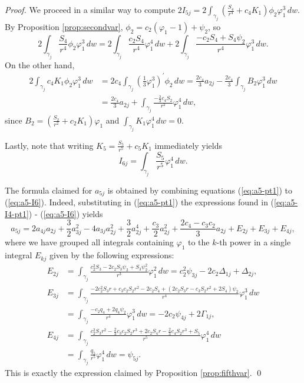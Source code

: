 \begin{proof}
We proceed in a similar way to compute $2I_{5j}=2\int_{\gamma_j}\left(\frac{S_4}{r^4}+c_4K_1\right)\phi_2\varphi_1^3\,dw$. By Proposition \ref{prop:secondvar}, $\phi_2=c_2(\varphi_1-1)+\psi_2$, so
\begin{equation}\label{eq:a5-I5-pt1}
2\int_{\gamma_j}\frac{S_4}{r^4}\phi_2\varphi_1^3\,dw=2\int_{\gamma_j}\frac{c_2S_4}{r^4}\varphi_1^4\,dw+2\int_{\gamma_j}\frac{-c_2S_4+S_4\psi_2}{r^4}\varphi_1^3\,dw. 
\end{equation}
On the other hand, 
\begin{align}\label{eq:a5-I5-pt2}
2\int_{\gamma_j}c_4K_1\phi_2\varphi_1^3\,dw	&= 2c_4\int_{\gamma_j}\left(\frac{1}{3}\varphi_1^3\right)^{\prime}\phi_2\,dw=\frac{2c_4}{3}a_{2j}-\frac{2c_4}{3}\int_{\gamma_j}B_2\varphi_1^3\,dw \nonumber \\
						&= \frac{2c_4}{3}a_{2j}+\int_{\gamma_j}\frac{-\frac{2}{3}c_4S_2}{r^2}\varphi_1^4\,dw, 
\end{align}
since $B_2=\left(\frac{S_2}{r^2}+c_2K_1\right)\varphi_1$ and $\int_{\gamma_j}K_1\varphi_1^4\,dw=0$.

Lastly, note that writing $K_5=\frac{S_5}{r^5}+c_5K_1$ immediately yields
\begin{equation}\label{eq:a5-I6}
I_{6j}=\int_{\gamma_j}\frac{S_5}{r^5}\varphi_1^4\,dw.
\end{equation}

The formula claimed for $a_{5j}$ is obtained by combining equations (\ref{eq:a5-pt1}) to (\ref{eq:a5-I6}). Indeed, substituting in (\ref{eq:a5-pt1}) the expressions found in (\ref{eq:a5-I4-pt1}) - (\ref{eq:a5-I6}) yields
\[ a_{5j}=2a_{4j}a_{2j}+\frac{3}{2}a_{3j}^2-4a_{3j}a_{2j}^2+\frac{3}{2}a_{2j}^4+ \frac{c_3}{2}a_{2j}^2+\frac{2c_4-c_3c_2}{3}a_{2j}+E_{2j}+E_{3j}+E_{4j}, \]
where we have grouped all integrals containing $\varphi_1$ to the $k$-th power in a single integral $E_{kj}$ given by the following expressions:
\begin{align*}
E_{2j}	&= \int_{\gamma_j}\frac{c_2^2S_3-2c_2S_3\psi_2+S_3\psi_2^2}{r^3}\varphi_1^2\,dw = c_2^2\psi_{3j}-2c_2\Delta_{1j}+\Delta_{2j}, \\[4pt]
E_{3j}	&= \int_{\gamma_j}\frac{-2c_2^2S_3r+c_3c_2S_2r^2-2c_2S_4+(2c_2S_3r-c_3S_2r^2+2S_4)\psi_2}{r^4}\varphi_1^3\,dw\\[4pt]
	&= \int_{\gamma_j}\frac{-c_2q_4+2q_4\psi_2}{r^4}\varphi_1^3\,dw = -2c_2\psi_{4j}+2\Gamma_{1j}, \\[4pt]
E_{4j}	&= \int_{\gamma_j}\frac{c_2^2S_3r^2-\frac{2}{3}c_3c_2S_2r^3+2c_2S_4r-\frac{2}{3}c_4S_2r^3+S_5}{r^5}\varphi_1^4\,dw\\[4pt]
	&= \int_{\gamma_j}\frac{q_5}{r^5}\varphi_1^4\,dw = \psi_{5j}.
\end{align*}
This is exactly the expression claimed by Proposition \ref{prop:fifthvar}. \qed
\end{proof}








